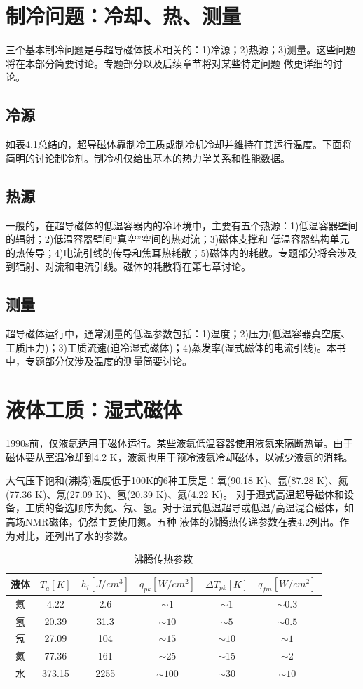 \section{制冷问题：冷却、热、测量}
三个基本制冷问题是与超导磁体技术相关的：1)冷源；2)热源；3)测量。这些问题将在本部分简要讨论。专题部分以及后续章节将对某些特定问题
做更详细的讨论。
\subsection{冷源}
如表4.1总结的，超导磁体靠制冷工质或制冷机冷却并维持在其运行温度。下面将简明的讨论制冷剂。制冷机仅给出基本的热力学关系和性能数据。
\subsection{热源}
一般的，在超导磁体的低温容器内的冷环境中，主要有五个热源：1)低温容器壁间的辐射；2)低温容器壁间“真空”空间的热对流；3)磁体支撑和
低温容器结构单元的热传导；4)电流引线的传导和焦耳热耗散；5)磁体内的耗散。专题部分将会涉及到辐射、对流和电流引线。磁体的耗散将在第七章讨论。
\subsection{测量}
超导磁体运行中，通常测量的低温参数包括：1)温度；2)压力(低温容器真空度、工质压力)；3)工质流速(迫冷湿式磁体)；4)蒸发率(湿式磁体的电流引线)。本书中，专题部分仅涉及温度的测量简要讨论。

\section{液体工质：湿式磁体}
1990s前，仅液氦适用于磁体运行。某些液氦低温容器使用液氮来隔断热量。由于磁体要从室温冷却到4.2 K，液氮也用于预冷液氦冷却磁体，以减少液氦的消耗。

大气压下饱和(沸腾)温度低于100K的6种工质是：氧(90.18 K)、氩(87.28 K)、氮(77.36 K)、氖(27.09 K)、氢(20.39 K)、氦(4.22 K)。
对于湿式高温超导磁体和设备，工质的备选顺序为氮、氖、氢。对于湿式低温超导或低温/高温混合磁体，如高场NMR磁体，仍然主要使用氦。五种
液体的沸腾热传递参数在表4.2列出。作为对比，还列出了水的参数。

\begin{table}[htbp]\small
  \centering
  \caption{沸腾传热参数} \label{boilingpara}
\begin{tabular}{|c||c|c|c|c|c|}
  \hline
\textbf{液体}&$T_a[K]$&$h_l[J/cm^3]$&$q_{pk}[W/cm^2]$&$\Delta T_{pk}[K]$&$q_{fm}[W/cm^2]$ \\ \hline \hline
氦&4.22&2.6&$\sim 1$&$\sim 1$&$\sim 0.3$\\ \hline
氢&20.39&31.3&$\sim 10$&$\sim 5$&$\sim 0.5$ \\ \hline
氖&27.09&104&$\sim 15$&$\sim 10$&$\sim 1$\\ \hline
氮&77.36&161&$\sim 25$&$\sim 15$&$\sim 2$\\ \hline
水&373.15&2255&$\sim 100$&$\sim 30$&$\sim 10$ \\ \hline
\end{tabular}
\end{table}

